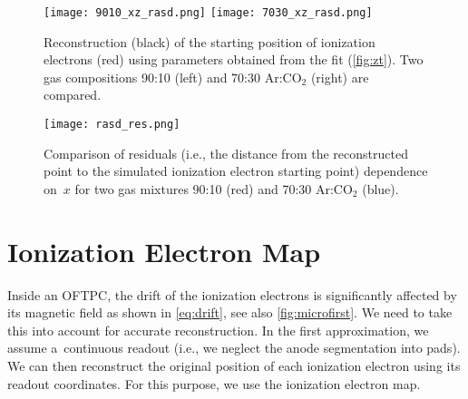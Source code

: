 		\begin{figure}
			\centering
			\texttt{[image: 9010\_xz\_rasd.png]}
			\hfill
			\texttt{[image: 7030\_xz\_rasd.png]}
			\caption{Reconstruction (black) of the starting position of ionization electrons (red) using parameters obtained from the fit (\cref{fig:zt}). Two gas compositions 90:10 (left) and 70:30 Ar:CO$_2$ (right) are compared.}
			\label{fig:rasd_xz}
		\end{figure}
		
		\begin{figure}
			\centering
			\texttt{[image: rasd\_res.png]}
			\caption{Comparison of residuals (i.e., the distance from the reconstructed point to the simulated ionization electron starting point) dependence on~$x$ for two gas mixtures 90:10 (red) and 70:30 Ar:CO$_2$ (blue).}
			\label{fig:rasd_res}
		\end{figure}
	
	\section{Ionization Electron Map}
	\label{sec:map}
		Inside an \ac{OFTPC}, the drift of the ionization electrons is significantly affected by its magnetic field as shown in \cref{eq:drift}, see also \cref{fig:microfirst}. We need to take this into account for accurate reconstruction. In the first approximation, we assume a~continuous readout (i.e., we neglect the anode segmentation into pads). We can then reconstruct the original position of each ionization electron using its readout coordinates. For this purpose, we use the ionization electron map.
		
